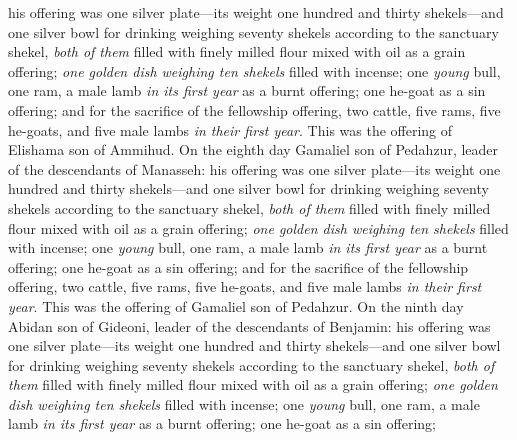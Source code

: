 \begin{biblechapter}
\verse his offering was one silver plate—its weight one hundred and thirty shekels—and one silver bowl for drinking weighing seventy shekels according to the sanctuary shekel, \textit{both of them} filled with finely milled flour mixed with oil as a grain offering;
\verse \textit{one golden dish weighing ten shekels} filled with incense;
\verse one \textit{young} bull, one ram, a male lamb \textit{in its first year} as a burnt offering;
\verse one he-goat as a sin offering;
\verse and for the sacrifice of the fellowship offering, two cattle, five rams, five he-goats, and five male lambs \textit{in their first year}. This was the offering of Elishama son of Ammihud.
\verse On the eighth day Gamaliel son of Pedahzur, leader of the descendants of Manasseh:
\verse his offering was one silver plate—its weight one hundred and thirty shekels—and one silver bowl for drinking weighing seventy shekels according to the sanctuary shekel, \textit{both of them} filled with finely milled flour mixed with oil as a grain offering;
\verse \textit{one golden dish weighing ten shekels} filled with incense;
\verse one \textit{young} bull, one ram, a male lamb \textit{in its first year} as a burnt offering;
\verse one he-goat as a sin offering;
\verse and for the sacrifice of the fellowship offering, two cattle, five rams, five he-goats, and five male lambs \textit{in their first year}. This was the offering of Gamaliel son of Pedahzur.
\verse On the ninth day Abidan son of Gideoni, leader of the descendants of Benjamin:
\verse his offering was one silver plate—its weight one hundred and thirty shekels—and one silver bowl for drinking weighing seventy shekels according to the sanctuary shekel, \textit{both of them} filled with finely milled flour mixed with oil as a grain offering;
\verse \textit{one golden dish weighing ten shekels} filled with incense;
\verse one \textit{young} bull, one ram, a male lamb \textit{in its first year} as a burnt offering;
\verse one he-goat as a sin offering;

\end{biblechapter}
